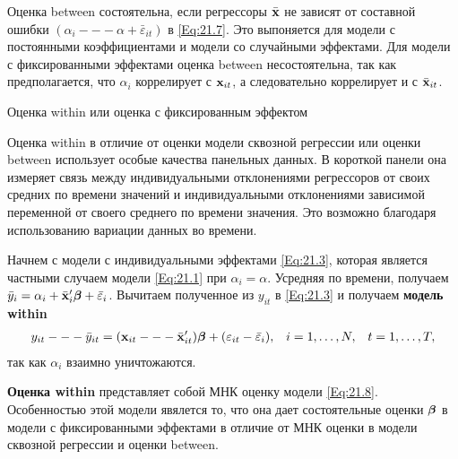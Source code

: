 Оценка between состоятельна, если регрессоры $\bar{\mathbf{x}}$ не зависят от составной ошибки  $(\alpha_i --- \alpha + \bar{\varepsilon}_{it})$ в \ref{Eq:21.7}. Это выпоняется для модели с постоянными коэффициентами и модели со случайными эффектами. Для модели с фиксированными эффектами оценка between несостоятельна, так как предполагается, что $\alpha_i$ коррелирует с $\mathbf{x}_{it}$, а следовательно коррелирует и с $\bar{\mathbf{x}}_{it}$.

{\centering 
Оценка within или оценка с фиксированным эффектом\\}

Оценка within в отличие от оценки модели сквозной регрессии или оценки between использует особые качества панельных данных. В короткой панели она измеряет связь между индивидуальными отклонениями регрессоров от своих средних по времени значений и индивидуальными отклонениями зависимой переменной от своего среднего по времени значения. Это возможно благодаря использованию вариации данных во времени.

Начнем с модели с индивидуальными эффектами \ref{Eq:21.3}, которая является частными случаем модели \ref{Eq:21.1} при $\alpha_i=\alpha$. Усредняя по времени, получаем $\bar{y}_i=\alpha_i+\bar{\mathbf{x}}'_{i} \bm{\beta}+\bar{\varepsilon}_i$. Вычитаем полученное из $y_{it}$ в  \ref{Eq:21.3} и получаем \textbf{модель within}
\begin{align}
& y_{it} --- \bar{y}_{it} = (\mathbf{x}_{it} --- \bar{\mathbf x}'_{it}) \bm{\beta} + (\varepsilon_{it}-\bar{\varepsilon}_i),
& i=1, \dots, N, &
& t=1, \dots, T,
\label{Eq:21.8}
\end{align}
так как $\alpha_i$ взаимно уничтожаются.

\textbf{Оценка within} представляет собой МНК оценку модели \ref{Eq:21.8}. Особенностью этой модели явялется то, что она дает состоятельные оценки $\bm{\beta}$ в модели с фиксированными эффектами в отличие от МНК оценки в модели сквозной регрессии и оценки between.


